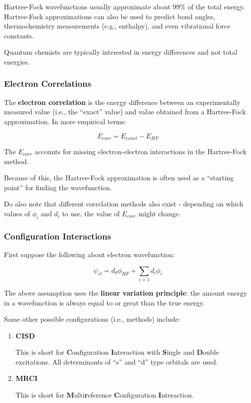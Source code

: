 \documentclass[
  letterpaper,
  DIV=11,
  numbers=noendperiod]{scrreprt}
\begin{document}
Hartree-Fock wavefunctions usually approximate about 99\% of the total
energy. Hartree-Fock approximations can also be used to predict bond
angles, thermochemistry measurements (e.g., enthalpy), and even
vibrational force constants.

Quantum chemists are typically interested in energy differences and not
total energies.

\hypertarget{electron-correlations}{%
\subsubsection{Electron Correlations}\label{electron-correlations}}

The \textbf{electron correlation} is the energy difference between an
experimentally measured value (i.e., the ``exact'' value) and value
obtained from a Hartree-Fock approximation. In more empirical terms:

\begin{equation}
  E_{corr} = E_{exact} - E_{HF}
\end{equation}

The \(E_{corr}\) accounts for missing electron-electron interactions in
the Hartree-Fock method.

Because of this, the Hartree-Fock approximation is often used as a
``starting point'' for finding the wavefunction.

Do also note that different correlation methods also exist - depending
on which values of \(\phi_i\) and \(d_i\) to use, the value of
\(E_{corr}\) might change.

\hypertarget{configuration-interactions}{%
\subsubsection{Configuration
Interactions}\label{configuration-interactions}}

First suppose the following about electron wavefunction:

\begin{equation}
  \psi_{el} = d_0\phi_{HF} + \sum_{i = 1}d_i\phi_i
\end{equation}

The above assumption uses the \textbf{linear variation principle}: the
amount energy in a wavefunction is always equal to or great than the
true energy.

Some other possible configurations (i.e., methods) include:

\begin{enumerate}
\def\labelenumi{\arabic{enumi}.}
\item
  \textbf{CISD}

  This is short for \textbf{C}onfiguration \textbf{I}nteraction with
  \textbf{S}ingle and \textbf{D}ouble excitations. All determinants of
  ``s'' and ``d'' type orbitals are used.
\item
  \textbf{MRCI}

  This is short for \textbf{M}ulti\textbf{r}eference
  \textbf{C}onfiguration \textbf{I}nteraction.
\end{enumerate}
\end{document}

